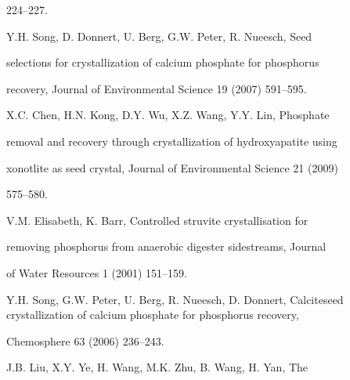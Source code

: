 \documentclass[a4paper,portrait,12pt]{article}
\begin{document}
224--227.


\begin{flushleft}
[3] Y.H. Song, D. Donnert, U. Berg, G.W. Peter, R. Nueesch, Seed
\end{flushleft}


\begin{flushleft}
selections for crystallization of calcium phosphate for phosphorus
\end{flushleft}


\begin{flushleft}
recovery, Journal of Environmental Science 19 (2007) 591--595.
\end{flushleft}


\begin{flushleft}
[4] X.C. Chen, H.N. Kong, D.Y. Wu, X.Z. Wang, Y.Y. Lin, Phosphate
\end{flushleft}


\begin{flushleft}
removal and recovery through crystallization of hydroxyapatite using
\end{flushleft}


\begin{flushleft}
xonotlite as seed crystal, Journal of Environmental Science 21 (2009)
\end{flushleft}


575--580.


\begin{flushleft}
[5] V.M. Elisabeth, K. Barr, Controlled struvite crystallisation for
\end{flushleft}


\begin{flushleft}
removing phosphorus from anaerobic digester sidestreams, Journal
\end{flushleft}


\begin{flushleft}
of Water Resources 1 (2001) 151--159.
\end{flushleft}


\begin{flushleft}
[6] Y.H. Song, G.W. Peter, U. Berg, R. Nueesch, D. Donnert, Calciteseed crystallization of calcium phosphate for phosphorus recovery,
\end{flushleft}


\begin{flushleft}
Chemosphere 63 (2006) 236--243.
\end{flushleft}


\begin{flushleft}
[7] J.B. Liu, X.Y. Ye, H. Wang, M.K. Zhu, B. Wang, H. Yan, The
\end{flushleft}
\end{document}
